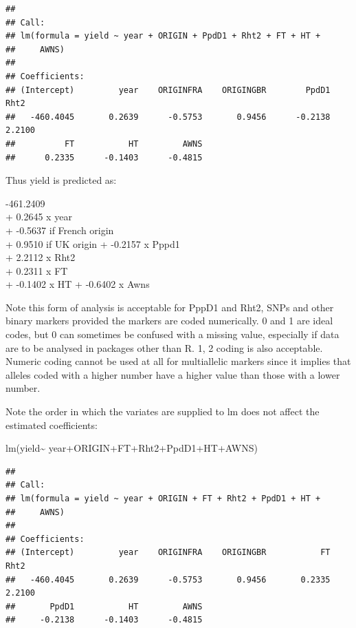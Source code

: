 \documentclass[
]{book}
\newenvironment{Shaded}{\begin{snugshade}}{\end{snugshade}}
\newcommand{\FunctionTok}[1]{\textcolor[rgb]{0.00,0.00,0.00}{#1}}
\newcommand{\NormalTok}[1]{#1}
\newcommand{\SpecialCharTok}[1]{\textcolor[rgb]{0.00,0.00,0.00}{#1}}
\begin{document}
\begin{verbatim}
## 
## Call:
## lm(formula = yield ~ year + ORIGIN + PpdD1 + Rht2 + FT + HT + 
##     AWNS)
## 
## Coefficients:
## (Intercept)         year    ORIGINFRA    ORIGINGBR        PpdD1         Rht2  
##   -460.4045       0.2639      -0.5753       0.9456      -0.2138       2.2100  
##          FT           HT         AWNS  
##      0.2335      -0.1403      -0.4815
\end{verbatim}

Thus yield is predicted as:

-461.2409\\
+ 0.2645 x year\\
+ -0.5637 if French origin\\
+ 0.9510 if UK origin
+ -0.2157 x Pppd1\\
+ 2.2112 x Rht2\\
+ 0.2311 x FT\\
+ -0.1402 x HT
+ -0.6402 x Awns

Note this form of analysis is acceptable for PppD1 and Rht2, SNPs and other binary markers provided the markers are coded numerically. 0 and 1 are ideal codes, but 0 can sometimes be confused with a missing value, especially if data are to be analysed in packages other than R. 1, 2 coding is also acceptable. Numeric coding cannot be used at all for multiallelic markers since it implies that alleles coded with a higher number have a higher value than those with a lower number.

Note the order in which the variates are supplied to lm does not affect the estimated coefficients:

\begin{Shaded}
\begin{Highlighting}[]
\FunctionTok{lm}\NormalTok{(yield}\SpecialCharTok{\textasciitilde{}}\NormalTok{ year}\SpecialCharTok{+}\NormalTok{ORIGIN}\SpecialCharTok{+}\NormalTok{FT}\SpecialCharTok{+}\NormalTok{Rht2}\SpecialCharTok{+}\NormalTok{PpdD1}\SpecialCharTok{+}\NormalTok{HT}\SpecialCharTok{+}\NormalTok{AWNS)}
\end{Highlighting}
\end{Shaded}

\begin{verbatim}
## 
## Call:
## lm(formula = yield ~ year + ORIGIN + FT + Rht2 + PpdD1 + HT + 
##     AWNS)
## 
## Coefficients:
## (Intercept)         year    ORIGINFRA    ORIGINGBR           FT         Rht2  
##   -460.4045       0.2639      -0.5753       0.9456       0.2335       2.2100  
##       PpdD1           HT         AWNS  
##     -0.2138      -0.1403      -0.4815
\end{verbatim}
\end{document}
